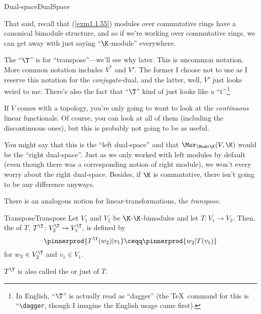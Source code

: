 \begin{dfn}{Dual-space}{DualSpace}
\begin{rmk}
		That said, recall that (\cref{exm1.1.55}) modules over commutative rings have a canonical bimodule structure, and so if we're working over commutative rings, we can get away with just saying ``$\K$-module'' everywhere.
	\end{rmk}
	\begin{rmk}
		The ``$\T$'' is for ``transpose''---we'll see why later.  This is uncommon notation.  More common notation includes $V^*$ and $V'$.  The former I choose not to use as I reserve this notation for the \emph{conjugate}-dual, and the latter, well, $V'$ just looks weird to me.  There's also the fact that ``$\T$'' kind of just looks like a ``t''.\footnote{In English, ``$\T$'' is actually read as ``dagger'' (the \TeX \ command for this is ``\texttt{\textbackslash dagger}, though I imagine the English usage came first).}
	\end{rmk}
	\begin{rmk}
		If $V$ comes with a topology, you're only going to want to look at the \emph{continuous} linear functionals.  Of course, you can look at all of them (including the discontinuous ones), but this is probably not going to be as useful.
	\end{rmk}
	\begin{rmk}
		You might say that this is the ``left dual-space'' and that $\Mor _{\Mod*{\K}}(V,\K )$ would be the ``right dual-space''.  Just as we only worked with left modules by default (even though there was a corresponding notion of right module), we won't every worry about the right dual-space.  Besides, if $\K$ is commutative, there isn't going to be any difference anyways.
	\end{rmk}
\end{dfn}
There is an analogous notion for linear-transformations, the \emph{transpose}.
\begin{dfn}{Transpose}{Transpose}
	Let $V_1$ and $V_2$ be $\K$-$\K$-bimodules and let $T\colon V_1\rightarrow V_2$.  Then, the  of $T$, $T^{\T}\colon V_2^{\T}\rightarrow V_1^{\T}$, is defined by
	\begin{equation}
	\pinnerprod{T^{\T}(w_2)|v_1}\ceqq \pinnerprod{w_2|T(v_1)}
	\end{equation}
	for $w_2\in V_2^{\T}$ and $v_1\in V_1$.
	\begin{rmk}
		$T^{\T}$ is also called the  or just  of $T$.
	\end{rmk}
\end{dfn}

